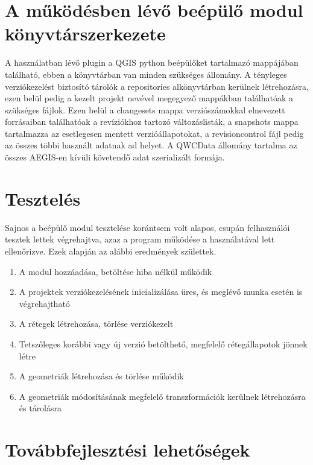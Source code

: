 \section{A működésben lévő beépülő modul könyvtárszerkezete}
A használatban lévő plugin a QGIS python beépülőket tartalmazó mappájában található, ebben a könyvtárban van minden szükséges állomány. A tényleges verziókezelést biztosító tárolók a repositories alkönyvtárban kerülnek létrehozásra, ezen belül pedig a kezelt projekt nevével megegyező mappákban találhatóak a szükséges fájlok. Ezen belül a changesets mappa verziószámokkal elnevezett forrásaiban találhatóak a revíziókhoz tartozó változáslisták, a snapshots mappa tartalmazza az esetlegesen mentett verzióállapotokat, a revisioncontrol fájl pedig az összes többi használt adatnak ad helyet. A QWCData állomány tartalma az összes AEGIS-en kívüli követendő adat szerializált formája.

\section{Tesztelés}
Sajnos a beépülő modul tesztelése korántsem volt alapos, csupán felhasználói tesztek lettek végrehajtva, azaz a program működése a használatával lett ellenőrizve. Ezek alapján az alábbi eredmények születtek.
\begin{enumerate}
	\item A modul hozzáadása, betöltése hiba nélkül működik
	\item A projektek verziókezelésének inicializálása üres, és meglévő munka esetén is végrehajtható
	\item A rétegek létrehozása, törlése verziókezelt
	\item Tetszőleges korábbi vagy új verzió betölthető, megfelelő rétegállapotok jönnek létre
	\item A geometriák létrehozása és törlése működik
	\item A geometriák módosításának megfelelő transzformációk kerülnek létrehozásra és tárolásra
\end{enumerate}

\section{Továbbfejlesztési lehetőségek}
